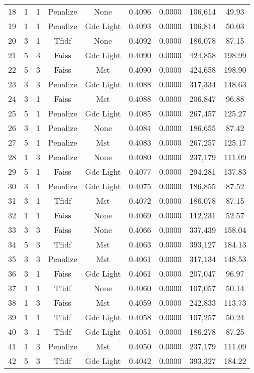 \begin{longtable}{@{}ccccccccc@{}}
18 & 1 & 1 & Penalize & None & 0.4096 & 0.0000 & 106,614 & 49.93 \\
19 & 1 & 1 & Penalize & Gdc Light & 0.4093 & 0.0000 & 106,814 & 50.03 \\
20 & 3 & 1 & Tfidf & None & 0.4092 & 0.0000 & 186,078 & 87.15 \\
21 & 5 & 3 & Faiss & Gdc Light & 0.4090 & 0.0000 & 424,858 & 198.99 \\
22 & 5 & 3 & Faiss & Mst & 0.4090 & 0.0000 & 424,658 & 198.90 \\
23 & 3 & 3 & Penalize & Gdc Light & 0.4088 & 0.0000 & 317,334 & 148.63 \\
24 & 3 & 1 & Faiss & Mst & 0.4088 & 0.0000 & 206,847 & 96.88 \\
25 & 5 & 1 & Penalize & Gdc Light & 0.4085 & 0.0000 & 267,457 & 125.27 \\
26 & 3 & 1 & Penalize & None & 0.4084 & 0.0000 & 186,655 & 87.42 \\
27 & 5 & 1 & Penalize & Mst & 0.4083 & 0.0000 & 267,257 & 125.17 \\
28 & 1 & 3 & Penalize & None & 0.4080 & 0.0000 & 237,179 & 111.09 \\
29 & 5 & 1 & Faiss & Gdc Light & 0.4077 & 0.0000 & 294,281 & 137.83 \\
30 & 3 & 1 & Penalize & Gdc Light & 0.4075 & 0.0000 & 186,855 & 87.52 \\
31 & 3 & 1 & Tfidf & Mst & 0.4072 & 0.0000 & 186,078 & 87.15 \\
32 & 1 & 1 & Faiss & None & 0.4069 & 0.0000 & 112,231 & 52.57 \\
33 & 3 & 3 & Faiss & None & 0.4066 & 0.0000 & 337,439 & 158.04 \\
34 & 5 & 3 & Tfidf & Mst & 0.4063 & 0.0000 & 393,127 & 184.13 \\
35 & 3 & 3 & Penalize & Mst & 0.4061 & 0.0000 & 317,134 & 148.53 \\
36 & 3 & 1 & Faiss & Gdc Light & 0.4061 & 0.0000 & 207,047 & 96.97 \\
37 & 1 & 1 & Tfidf & None & 0.4060 & 0.0000 & 107,057 & 50.14 \\
38 & 1 & 3 & Faiss & Mst & 0.4059 & 0.0000 & 242,833 & 113.73 \\
39 & 1 & 1 & Tfidf & Gdc Light & 0.4058 & 0.0000 & 107,257 & 50.24 \\
40 & 3 & 1 & Tfidf & Gdc Light & 0.4051 & 0.0000 & 186,278 & 87.25 \\
41 & 1 & 3 & Penalize & Mst & 0.4050 & 0.0000 & 237,179 & 111.09 \\
42 & 5 & 3 & Tfidf & Gdc Light & 0.4042 & 0.0000 & 393,327 & 184.22 \\

\end{longtable}
